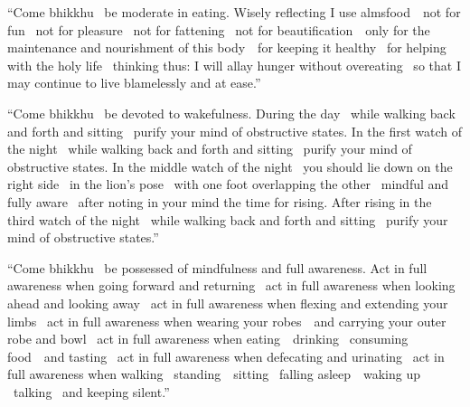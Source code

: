 \ifbfive\clearpage\fi

\begin{english-only-justify}
  ``Come bhikkhu \breathmark\ be moderate in eating. Wisely reflecting I use \mbox{almsfood}~\breathmark\ not for fun \breathmark\ not for pleasure \breathmark\ not for fattening \breathmark\ not for \mbox{beautification}~\breathmark\ only for the maintenance and nourishment of this \mbox{body}~\breathmark\ for keeping it healthy \breathmark\ for helping with the holy life \breathmark\ thinking thus: I will allay hunger without overeating \breathmark\ so that I may continue to live blamelessly and at ease.''
\end{english-only-justify}

\begin{english-only-justify}
  ``Come bhikkhu \breathmark\ be devoted to wakefulness. During the day \breathmark\ while walking back and forth and sitting \breathmark\ purify your mind of obstructive states. In the first watch of the night \breathmark\ while walking back and forth and sitting \breathmark\ purify your mind of obstructive states. In the middle watch of the night \breathmark\ you should lie down on the right side \breathmark\ in the lion's pose \breathmark\ with one foot overlapping the other \breathmark\ mindful and fully aware \breathmark\ after noting in your mind the time for rising. After rising in the third watch of the night \breathmark\ while walking back and forth and sitting \breathmark\ purify your mind of obstructive states.''
\end{english-only-justify}

\begin{english-only-justify}
  ``Come bhikkhu \breathmark\ be possessed of mindfulness and full awareness. Act in full awareness when going forward and returning \breathmark\ act in full awareness when looking ahead and looking away \breathmark\ act in full awareness when flexing and extending your limbs \breathmark\ act in full awareness when wearing your \mbox{robes}~\breathmark\ and carrying your outer robe and bowl \breathmark\ act in full awareness when \mbox{eating}~\breathmark\ drinking \breathmark\ consuming \mbox{food}~\breathmark\ and tasting \breathmark\ act in full awareness when defecating and urinating \breathmark\ act in full awareness when walking \breathmark\ \mbox{standing}~\breathmark\ sitting \breathmark\ falling \mbox{asleep}~\breathmark\ waking up\makeatletter\hyperlink{endnote60-appendix}\makeatother
 \breathmark\ talking \breathmark\ and keeping silent.''
\end{english-only-justify}


